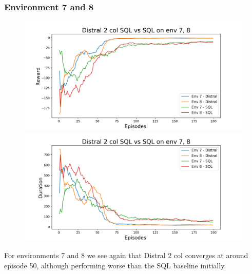\documentclass[12pt]{report}
\begin{document}
\subsubsection{Environment 7 and 8}
\begin{figure}[H]
\centering
\begin{minipage}{.5\textwidth}
\centering
\includegraphics[width=\textwidth]{figs/d2_col_sql/d2_col_sql_7_8_rwd.png}
\end{minipage}%
\centering
\begin{minipage}{.5\textwidth}
\centering
\includegraphics[width=\textwidth]{figs/d2_col_sql/d2_col_sql_7_8_dur.png}
\end{minipage}%
\end{figure}
For environments 7 and 8 we see again that Distral 2 col converges at around episode 50, although performing worse than the SQL baseline initially.
\end{document}
